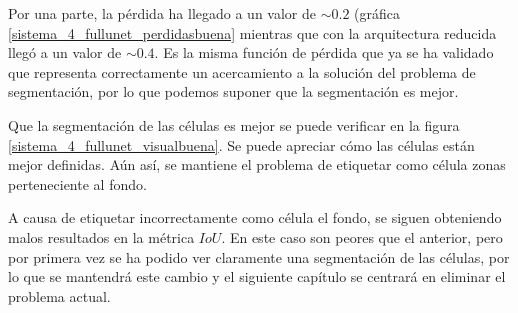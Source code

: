 

Por una parte, la pérdida ha llegado a un valor de $\sim 0.2$ (gráfica \ref{sistema_4_fullunet_perdidasbuena} mientras que con la arquitectura reducida  llegó a un valor de $\sim 0.4$. Es la misma función de pérdida que ya se ha validado que representa correctamente un acercamiento a la solución del problema de segmentación, por lo que podemos suponer que la segmentación es mejor.

Que la segmentación de las células es mejor se puede verificar en la figura \ref{sistema_4_fullunet_visualbuena}. Se puede apreciar cómo las células están mejor definidas. Aún así, se mantiene el problema de etiquetar como célula zonas perteneciente al fondo.

A causa de etiquetar incorrectamente como célula el fondo, se siguen obteniendo malos resultados en la métrica $IoU$. En este caso son peores que el anterior, pero por primera vez se ha podido ver claramente una segmentación de las células, por lo que se mantendrá este cambio y el siguiente capítulo se centrará en eliminar el problema actual.